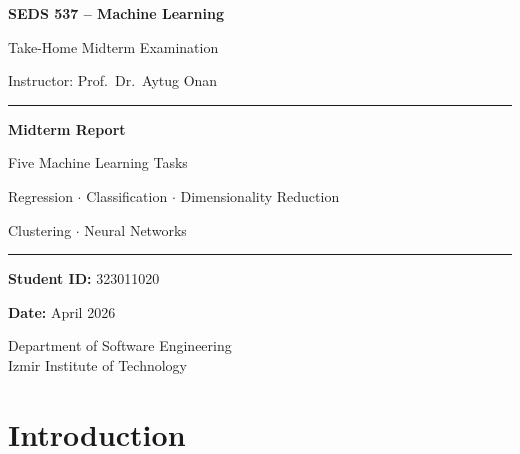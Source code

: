 \documentclass[11pt,a4paper]{article}
\begin{document}
\begin{titlepage}
    \centering
    \vspace*{1.5cm}

    {\Large \textbf{SEDS 537 -- Machine Learning} \par}
    \vspace{0.4cm}
    {\large Take-Home Midterm Examination \par}
    \vspace{0.2cm}
    {\small Instructor: Prof.\ Dr.\ Aytug Onan \par}

    \vspace{1.5cm}
    \rule{\linewidth}{1.5pt}
    \vspace{0.3cm}

    {\LARGE \textbf{Midterm Report} \par}
    \vspace{0.2cm}
    {\Large Five Machine Learning Tasks \par}
    \vspace{0.3cm}
    {\large Regression $\cdot$ Classification $\cdot$ Dimensionality Reduction \par}
    {\large Clustering $\cdot$ Neural Networks \par}

    \vspace{0.3cm}
    \rule{\linewidth}{1.5pt}

    \vspace{1.5cm}
    {\large \textbf{Student ID:} 323011020 \par}
    \vspace{0.3cm}
    {\large \textbf{Date:} April 2026 \par}

    \vfill
    {\small Department of Software Engineering \\
    Izmir Institute of Technology}
\end{titlepage}

\tableofcontents
\newpage

\section*{Introduction}
\end{document}
